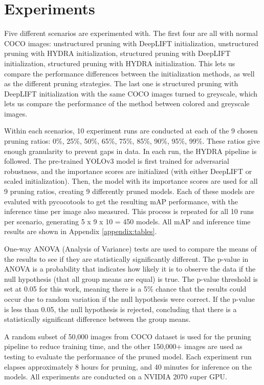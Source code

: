 \documentclass[journal,onecolumn,12pt]{IEEEtran}
\begin{document}
\section{Experiments}

Five different scenarios are experimented with. The first four are all with normal COCO images: unstructured pruning with DeepLIFT initialization, unstructured pruning with HYDRA initialization, structured pruning with DeepLIFT initialization, structured pruning with HYDRA initialization. This lets us compare the performance differences between the initialization methods, as well as the different pruning strategies. The last one is structured pruning with DeepLIFT initialization with the same COCO images turned to greyscale, which lets us compare the performance of the method between colored and greyscale images.

Within each scenarios, 10 experiment runs are conducted at each of the 9 chosen pruning ratios: 0\%, 25\%, 50\%, 65\%, 75\%, 85\%, 90\%, 95\%, 99\%. These ratios give enough granularity to prevent gaps in data. In each run, the HYDRA pipeline is followed. The pre-trained YOLOv3 model is first trained for adversarial robustness, and the importance scores are initialized (with either DeepLIFT or scaled initialization). Then, the model with its importance scores are used for all 9 pruning ratios, creating 9 differently pruned models. Each of these models are evaluted with pycocotools to get the resulting mAP performance, with the inference time per image also measured. This process is repeated for all 10 runs per scenario, generating 5 x 9 x 10 = 450 models. All mAP and inference time results are shown in Appendix \ref{appendix:tables}.

One-way ANOVA (Analysis of Variance) tests are used to compare the means of the results to see if they are statistically significantly different. The p-value in ANOVA is a probability that indicates how likely it is to observe the data if the null hypothesis (that all group means are equal) is true. The p-value threshold is set at 0.05 for this work, meaning there is a 5\% chance that the results could occur due to random variation if the null hypothesis were correct. If the p-value is less than 0.05, the null hypothesis is rejected, concluding that there is a statistically significant difference between the group means.

A random subset of 50,000 images from COCO dataset is used for the pruning pipeline to reduce training time, and the other 150,000+ images are used as testing to evaluate the performance of the pruned model. Each experiment run elapses approximately 8 hours for pruning, and 40 minutes for inference on the models. All experiments are conducted on a NVIDIA 2070 super GPU.
\end{document}

